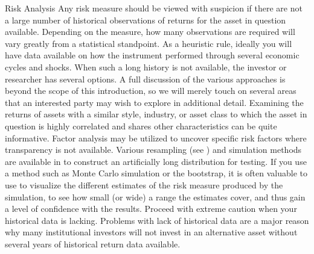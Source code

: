 \documentclass[12pt,letterpaper,english]{article}
\begin{document}
\begin{Section}{Risk Analysis}
Any risk measure should be viewed with suspicion if there are not a large number of historical observations of returns for the asset in question available.  Depending on the measure, how many observations are required will vary greatly from a statistical standpoint.  As a heuristic rule, ideally you will have data available on how the instrument performed through several economic cycles and shocks.  When such a long history is not available, the investor or researcher has several options.  A full discussion of the various approaches is beyond the scope of this introduction, so we will merely touch on several areas that an interested party may wish to explore in additional detail. Examining the returns of assets with a similar style, industry, or asset class to which the asset in question is highly correlated and shares other characteristics can be quite informative.  Factor analysis may be utilized to uncover specific risk factors where transparency is not available. Various resampling (see ) and simulation methods are available in \R{} to construct an artificially long distribution for testing.  If you use a method such as Monte Carlo simulation or the bootstrap, it is often valuable to use  to visualize the different estimates of the risk measure produced by the simulation, to see how small (or wide) a range the estimates cover, and thus gain a level of confidence with the results.  Proceed with extreme caution when your historical data is lacking.  Problems with lack of historical data are a major reason why many institutional investors will not invest in an alternative asset without several years of historical return data available.
\end{Section}
\end{document}
